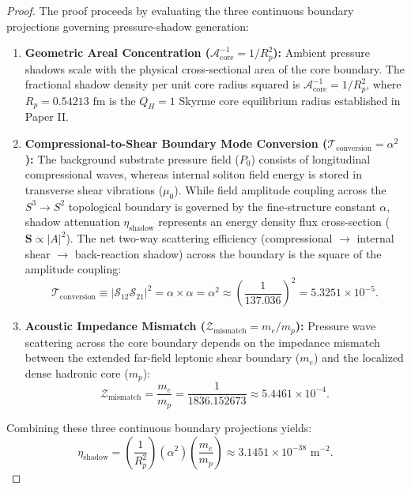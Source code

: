 \documentclass[11pt,a4paper]{article}
\begin{document}
	\begin{proof}
		The proof proceeds by evaluating the three continuous boundary projections governing pressure-shadow generation:
		\begin{enumerate}
			\item \textbf{Geometric Areal Concentration ($\mathcal{A}_{\text{core}}^{-1} = 1/R_p^2$):} Ambient pressure shadows scale with the physical cross-sectional area of the core boundary. The fractional shadow density per unit core radius squared is $\mathcal{A}_{\text{core}}^{-1} = 1/R_p^2$, where $R_p = 0.54213 \text{ fm}$ is the $Q_H = 1$ Skyrme core equilibrium radius established in Paper II.
			\item \textbf{Compressional-to-Shear Boundary Mode Conversion ($\mathcal{T}_{\text{conversion}} = \alpha^2$):} The background substrate pressure field ($P_0$) consists of longitudinal compressional waves, whereas internal soliton field energy is stored in transverse shear vibrations ($\mu_0$). While field amplitude coupling across the $S^3 \to S^2$ topological boundary is governed by the fine-structure constant $\alpha$, shadow attenuation $\eta_{\text{shadow}}$ represents an energy density flux cross-section ($\mathbf{S} \propto |A|^2$). The net two-way scattering efficiency (compressional $\to$ internal shear $\to$ back-reaction shadow) across the boundary is the square of the amplitude coupling:
			\begin{equation}
				\mathcal{T}_{\text{conversion}} \equiv \left| \mathcal{S}_{12} \mathcal{S}_{21} \right|^2 = \alpha \times \alpha = \alpha^2 \approx \left(\frac{1}{137.036}\right)^2 = 5.3251 \times 10^{-5}.
				\label{eq:T_conversion_proof}
			\end{equation}
			\item \textbf{Acoustic Impedance Mismatch ($\mathcal{Z}_{\text{mismatch}} = m_e/m_p$):} Pressure wave scattering across the core boundary depends on the impedance mismatch between the extended far-field leptonic shear boundary ($m_e$) and the localized dense hadronic core ($m_p$):
			\begin{equation}
				\mathcal{Z}_{\text{mismatch}} = \frac{m_e}{m_p} = \frac{1}{1836.152673} \approx 5.4461 \times 10^{-4}.
			\end{equation}
		\end{enumerate}
		Combining these three continuous boundary projections yields:
		\begin{equation}
			\eta_{\text{shadow}} = \left( \frac{1}{R_p^2} \right) \left( \alpha^2 \right) \left( \frac{m_e}{m_p} \right) \approx 3.1451 \times 10^{-38} \text{ m}^{-2}.

\end{equation}
\end{proof}
\end{document}
